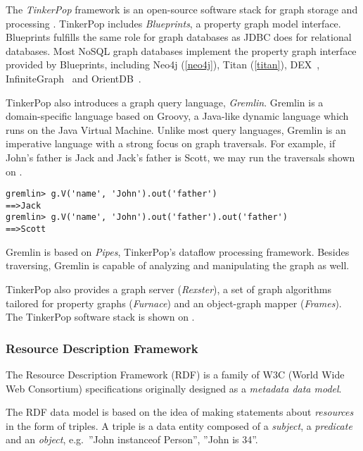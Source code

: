 The \emph{TinkerPop} framework is an open-source software stack for graph storage and processing \cite{TinkerPop}. TinkerPop includes \emph{Blueprints}, a property graph model interface. Blueprints fulfills the same role for graph databases as JDBC does for relational databases. Most NoSQL graph databases implement the property graph interface provided by Blueprints, including Neo4j (\autoref{neo4j}), Titan (\autoref{titan}), DEX~\cite{DEX}, InfiniteGraph~\cite{InfiniteGraph} and OrientDB~\cite{OrientDB}.

 
TinkerPop also introduces a graph query language, \textit{Gremlin}. Gremlin is a domain-specific language based on Groovy, a Java-like dynamic language which runs on the Java Virtual Machine. Unlike most query languages, Gremlin is an imperative language with a strong focus on graph traversals. For example, if John's father is Jack and Jack's father is Scott, we may run the traversals shown on .

\begin{lstlisting}[caption=Simple Gremlin queries, label=lst:gremlin-queries]
gremlin> g.V('name', 'John').out('father')
==>Jack
gremlin> g.V('name', 'John').out('father').out('father')
==>Scott
\end{lstlisting}

Gremlin is based on \textit{Pipes}, TinkerPop's dataflow processing framework. Besides traversing, Gremlin is capable of analyzing and manipulating the graph as well.

TinkerPop also provides a graph server (\textit{Rexster}), a set of graph algorithms tailored for property graphs (\textit{Furnace}) and an object-graph mapper (\textit{Frames}). The TinkerPop software stack is shown on .

\subsubsection{Resource Description Framework}

The Resource Description Framework (RDF) is a family of W3C (World Wide Web Consortium) specifications originally designed as a \emph{metadata data model}. 

The RDF data model is based on the idea of making statements about \emph{resources} in the form of triples. A triple is a data entity composed of a \emph{subject}, a \emph{predicate} and an \emph{object}, e.g.\ ''John instanceof Person'', ''John is 34''.  

